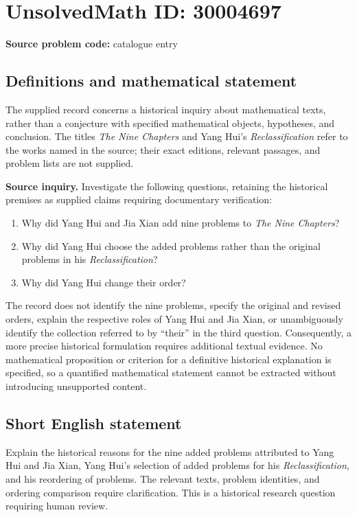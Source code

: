\documentclass[11pt]{article}
\begin{document}
\section*{UnsolvedMath ID: 30004697}
\textbf{Source problem code:} catalogue entry
\subsection{Definitions and mathematical statement}
The supplied record concerns a historical inquiry about mathematical texts, rather than a conjecture with specified mathematical objects, hypotheses, and conclusion. The titles \emph{The Nine Chapters} and Yang Hui's \emph{Reclassification} refer to the works named in the source; their exact editions, relevant passages, and problem lists are not supplied.

\textbf{Source inquiry.} Investigate the following questions, retaining the historical premises as supplied claims requiring documentary verification:
\begin{enumerate}
\item Why did Yang Hui and Jia Xian add nine problems to \emph{The Nine Chapters}?
\item Why did Yang Hui choose the added problems rather than the original problems in his \emph{Reclassification}?
\item Why did Yang Hui change their order?
\end{enumerate}
The record does not identify the nine problems, specify the original and revised orders, explain the respective roles of Yang Hui and Jia Xian, or unambiguously identify the collection referred to by ``their'' in the third question. Consequently, a more precise historical formulation requires additional textual evidence. No mathematical proposition or criterion for a definitive historical explanation is specified, so a quantified mathematical statement cannot be extracted without introducing unsupported content.
\subsection{Short English statement}
Explain the historical reasons for the nine added problems attributed to Yang Hui and Jia Xian, Yang Hui's selection of added problems for his \emph{Reclassification}, and his reordering of problems. The relevant texts, problem identities, and ordering comparison require clarification. This is a historical research question requiring human review.
\end{document}
